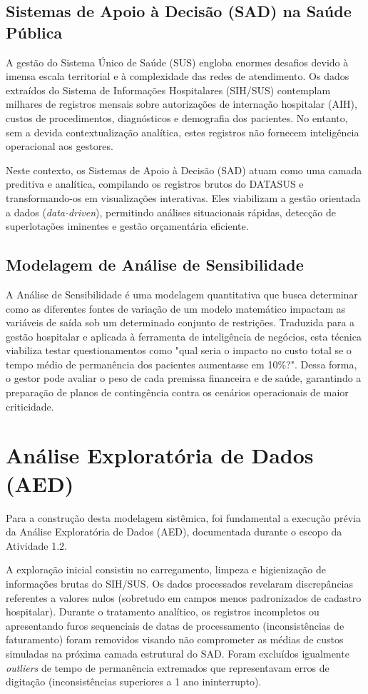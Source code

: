 \documentclass[12pt]{article}
\begin{document}
\subsection{Sistemas de Apoio à Decisão (SAD) na Saúde Pública}
A gestão do Sistema Único de Saúde (SUS) engloba enormes desafios devido à imensa escala territorial e à complexidade das redes de atendimento. Os dados extraídos do Sistema de Informações Hospitalares (SIH/SUS) contemplam milhares de registros mensais sobre autorizações de internação hospitalar (AIH), custos de procedimentos, diagnósticos e demografia dos pacientes. No entanto, sem a devida contextualização analítica, estes registros não fornecem inteligência operacional aos gestores. 

Neste contexto, os Sistemas de Apoio à Decisão (SAD) atuam como uma camada preditiva e analítica, compilando os registros brutos do DATASUS e transformando-os em visualizações interativas. Eles viabilizam a gestão orientada a dados (\textit{data-driven}), permitindo análises situacionais rápidas, detecção de superlotações iminentes e gestão orçamentária eficiente.

\subsection{Modelagem de Análise de Sensibilidade}
A Análise de Sensibilidade é uma modelagem quantitativa que busca determinar como as diferentes fontes de variação de um modelo matemático impactam as variáveis de saída sob um determinado conjunto de restrições. Traduzida para a gestão hospitalar e aplicada à ferramenta de inteligência de negócios, esta técnica viabiliza testar questionamentos como "qual seria o impacto no custo total se o tempo médio de permanência dos pacientes aumentasse em 10\%?". Dessa forma, o gestor pode avaliar o peso de cada premissa financeira e de saúde, garantindo a preparação de planos de contingência contra os cenários operacionais de maior criticidade.

\section{Análise Exploratória de Dados (AED)}
Para a construção desta modelagem sistêmica, foi fundamental a execução prévia da Análise Exploratória de Dados (AED), documentada durante o escopo da Atividade 1.2. 

A exploração inicial consistiu no carregamento, limpeza e higienização de informações brutas do SIH/SUS. Os dados processados revelaram discrepâncias referentes a valores nulos (sobretudo em campos menos padronizados de cadastro hospitalar). Durante o tratamento analítico, os registros incompletos ou apresentando furos sequenciais de datas de processamento (inconsistências de faturamento) foram removidos visando não comprometer as médias de custos simuladas na próxima camada estrutural do SAD. Foram excluídos igualmente \textit{outliers} de tempo de permanência extremados que representavam erros de digitação (inconsistências superiores a 1 ano ininterrupto).
\end{document}
